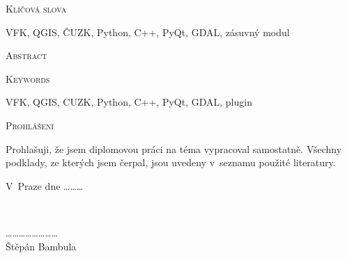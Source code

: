 \documentclass[a4paper,12pt,oneside]{book}
\begin{document}
\vspace{32pt}

\noindent
\textsc{\Large Klíčová slova}

\vspace{12pt}

VFK, QGIS, ČUZK, Python, C++, PyQt, GDAL, zásuvný modul


\vfill

\noindent
\textsc{\Large Abstract}

\vspace{12pt}


\vspace{32pt}

\noindent
\textsc{\Large Keywords}

\vspace{12pt}
VFK, QGIS, CUZK, Python, C++, PyQt, GDAL, plugin


\vfill

\clearpage
\vspace*{\fill}

\noindent
\textsc{\Large Prohlášení}

\vspace{12pt}
Prohlašuji, že jsem diplomovou práci na téma  vypracoval samostatně. Všechny podklady, ze kterých jsem čerpal, jsou uvedeny v~seznamu použité literatury.

\vspace{24pt}
\noindent
\begin{minipage}{0.4\textwidth}
\begin{flushleft}
\center 
V~Praze dne \dots \dots \dots \\
\end{flushleft}
\end{minipage}
~
\begin{minipage}{0.8\textwidth}
\begin{flushright} 
\vspace{20pt}
\center
\dots \dots \dots \dots \dots \dots \dots \dots \\
Štěpán Bambula
\end{flushright}
\end{minipage}\\[2cm]


\clearpage
\vspace*{\fill}
\end{document}
